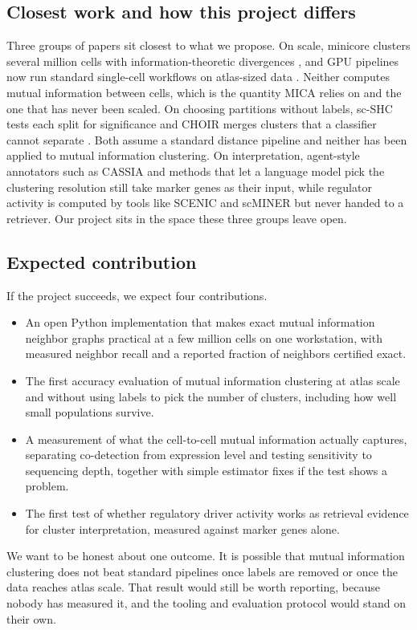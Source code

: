 \subsection{Closest work and how this project differs}
Three groups of papers sit closest to what we propose. On scale, minicore clusters several million cells with information-theoretic divergences \cite{baker2021minicore}, and GPU pipelines now run standard single-cell workflows on atlas-sized data \cite{dicks2026rapids}. Neither computes mutual information between cells, which is the quantity MICA relies on and the one that has never been scaled. On choosing partitions without labels, sc-SHC tests each split for significance \cite{grabski2023significance} and CHOIR merges clusters that a classifier cannot separate \cite{sant2025choir}. Both assume a standard distance pipeline and neither has been applied to mutual information clustering. On interpretation, agent-style annotators such as CASSIA \cite{xie2025cassia} and methods that let a language model pick the clustering resolution \cite{song2025gptanno} still take marker genes as their input, while regulator activity is computed by tools like SCENIC \cite{aibar2017scenic} and scMINER but never handed to a retriever. Our project sits in the space these three groups leave open.

\subsection{Expected contribution}
If the project succeeds, we expect four contributions.

\begin{itemize}
\item An open Python implementation that makes exact mutual information neighbor graphs practical at a few million cells on one workstation, with measured neighbor recall and a reported fraction of neighbors certified exact.
\item The first accuracy evaluation of mutual information clustering at atlas scale and without using labels to pick the number of clusters, including how well small populations survive.
\item A measurement of what the cell-to-cell mutual information actually captures, separating co-detection from expression level and testing sensitivity to sequencing depth, together with simple estimator fixes if the test shows a problem.
\item The first test of whether regulatory driver activity works as retrieval evidence for cluster interpretation, measured against marker genes alone.
\end{itemize}

We want to be honest about one outcome. It is possible that mutual information clustering does not beat standard pipelines once labels are removed or once the data reaches atlas scale. That result would still be worth reporting, because nobody has measured it, and the tooling and evaluation protocol would stand on their own.
